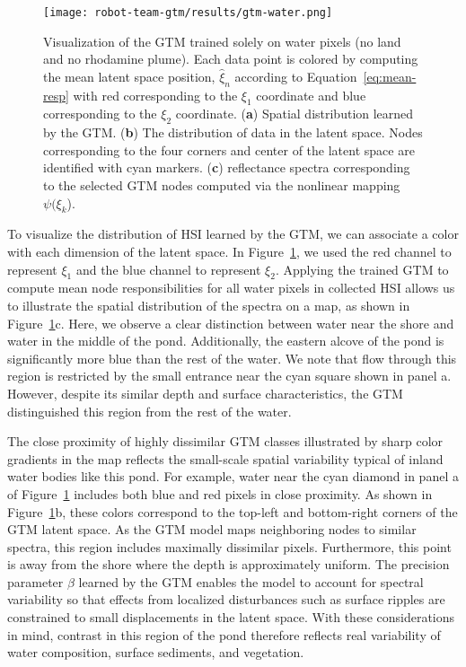 \begin{figure}[H]
  \centering
  \texttt{[image: robot-team-gtm/results/gtm-water.png]}
  \caption{Visualization of the GTM trained solely on water pixels (no land and
    no rhodamine plume). Each data point is colored by computing the mean latent
    space position, $\hat{\xi}_n$ according to Equation~\eqref{eq:mean-resp}
    with red corresponding to the $\xi_1$ coordinate and blue corresponding to
    the $\xi_2$ coordinate. (\textbf{a}) Spatial distribution learned by the
    GTM. (\textbf{b}) The distribution of data in the latent space. Nodes
    corresponding to the four corners and center of the latent space are
    identified with cyan markers. (\textbf{c}) reflectance spectra corresponding
    to the selected GTM nodes computed via the nonlinear mapping
    $\psi(\xi_k$).}
  \label{fig:gtm-water}
\end{figure}

To visualize the distribution of HSI learned by the GTM, we can associate a color with each dimension of the latent space. In Figure~\ref{fig:gtm-water}, we used the red channel to represent $\xi_1$ and the blue channel to represent $\xi_2$. Applying the trained GTM to compute mean node responsibilities for all water pixels in collected HSI allows us to illustrate the spatial distribution of the spectra on a map, as shown in Figure~\ref{fig:gtm-water}c. Here, we observe a clear distinction between water near the shore and water in the middle of the pond. Additionally, the eastern alcove of the pond is significantly more blue than the rest of the water. We note that flow through this region is restricted by the small entrance near the cyan square shown in panel a. However, despite its similar depth and surface characteristics, the GTM distinguished this region from the rest of the water.

The close proximity of highly dissimilar GTM classes illustrated by sharp color gradients in the map reflects the small-scale spatial variability typical of inland water bodies like this pond. For example, water near the cyan diamond in panel a of Figure~\ref{fig:gtm-water} includes both blue and red pixels in close proximity. As shown in Figure~\ref{fig:gtm-water}b, these colors correspond to the top-left and bottom-right corners of the GTM latent space. As the GTM model maps neighboring nodes to similar spectra, this region includes maximally dissimilar pixels. Furthermore, this point is away from the shore where the depth is approximately uniform. The precision parameter $\beta$ learned by the GTM enables the model to account for spectral variability so that effects from localized disturbances such as surface ripples are constrained to small displacements in the latent space. With these considerations in mind, contrast in this region of the pond therefore reflects real variability of water composition, surface sediments, and vegetation.


